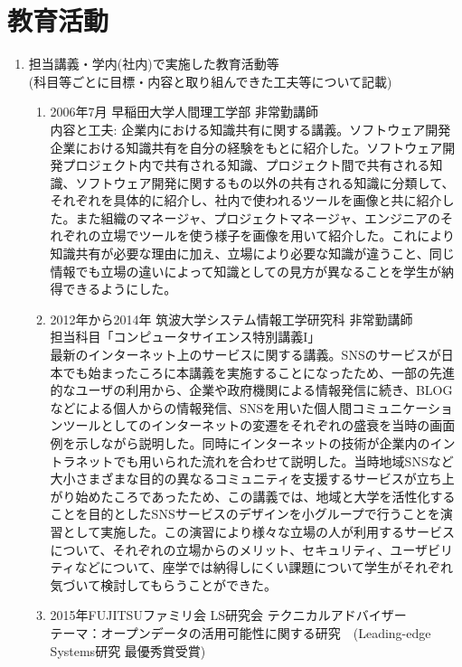 \documentclass[dvipdfmx]{jlreq}
\begin{document}
\newpage
\setcounter{section}{1}
\section{教育活動}

\begin{enumerate}
\item 担当講義・学内(社内)で実施した教育活動等\\
(科目等ごとに目標・内容と取り組んできた工夫等について記載)
\begin{enumerate}
\item 2006年7月 早稲田大学人間理工学部 非常勤講師\\
内容と工夫: 企業内における知識共有に関する講義。ソフトウェア開発企業における知識共有を自分の経験をもとに紹介した。ソフトウェア開発プロジェクト内で共有される知識、プロジェクト間で共有される知識、ソフトウェア開発に関するもの以外の共有される知識に分類して、それぞれを具体的に紹介し、社内で使われるツールを画像と共に紹介した。また組織のマネージャ、プロジェクトマネージャ、エンジニアのそれぞれの立場でツールを使う様子を画像を用いて紹介した。これにより知識共有が必要な理由に加え、立場により必要な知識が違うこと、同じ情報でも立場の違いによって知識としての見方が異なることを学生が納得できるようにした。
\item 2012年から2014年 筑波大学システム情報工学研究科 非常勤講師\\
担当科目「コンピュータサイエンス特別講義I」\\
最新のインターネット上のサービスに関する講義。SNSのサービスが日本でも始まったころに本講義を実施することになったため、一部の先進的なユーザの利用から、企業や政府機関による情報発信に続き、BLOGなどによる個人からの情報発信、SNSを用いた個人間コミュニケーションツールとしてのインターネットの変遷をそれぞれの盛衰を当時の画面例を示しながら説明した。同時にインターネットの技術が企業内のイントラネットでも用いられた流れを合わせて説明した。当時地域SNSなど大小さまざまな目的の異なるコミュニティを支援するサービスが立ち上がり始めたころであったため、この講義では、地域と大学を活性化することを目的としたSNSサービスのデザインを小グループで行うことを演習として実施した。この演習により様々な立場の人が利用するサービスについて、それぞれの立場からのメリット、セキュリティ、ユーザビリティなどについて、座学では納得しにくい課題について学生がそれぞれ気づいて検討してもらうことができた。
\item 2015年FUJITSUファミリ会 LS研究会 テクニカルアドバイザー\\
テーマ：オープンデータの活用可能性に関する研究　(Leading-edge Systems研究 最優秀賞受賞)\\

\end{enumerate}
\end{enumerate}
\end{document}
